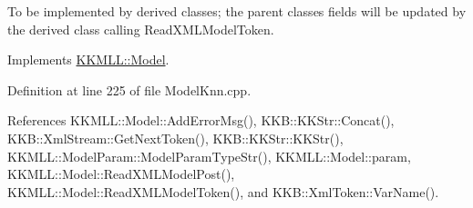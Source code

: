To be implemented by derived classes; the parent classes fields will be updated by the derived class calling Read\+X\+M\+L\+Model\+Token. 



Implements \hyperlink{class_k_k_m_l_l_1_1_model_ab7f1d1441936048db8cec7e9ec987f34}{K\+K\+M\+L\+L\+::\+Model}.



Definition at line 225 of file Model\+Knn.\+cpp.



References K\+K\+M\+L\+L\+::\+Model\+::\+Add\+Error\+Msg(), K\+K\+B\+::\+K\+K\+Str\+::\+Concat(), K\+K\+B\+::\+Xml\+Stream\+::\+Get\+Next\+Token(), K\+K\+B\+::\+K\+K\+Str\+::\+K\+K\+Str(), K\+K\+M\+L\+L\+::\+Model\+Param\+::\+Model\+Param\+Type\+Str(), K\+K\+M\+L\+L\+::\+Model\+::param, K\+K\+M\+L\+L\+::\+Model\+::\+Read\+X\+M\+L\+Model\+Post(), K\+K\+M\+L\+L\+::\+Model\+::\+Read\+X\+M\+L\+Model\+Token(), and K\+K\+B\+::\+Xml\+Token\+::\+Var\+Name().



